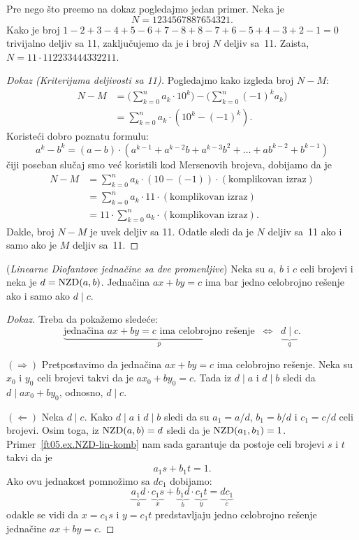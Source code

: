 Pre nego \v sto pre\dj emo na dokaz pogledajmo jedan primer. Neka je
$$
  N = 1234567887654321.
$$
Kako je broj $1 - 2 + 3 - 4 + 5 - 6 + 7 - 8 + 8 - 7 + 6 - 5 + 4 - 3 + 2 - 1 = 0$
trivijalno deljiv sa 11, zaklju\v cujemo da je i broj $N$ deljiv sa~11. Zaista, $N = 11 \cdot 112233444332211$.

\begin{proof}[Dokaz (Kriterijuma deljivosti sa 11)]
  Pogledajmo kako izgleda broj $N - M$:
  \begin{align*}
    N - M &= \Big(\sum_{k=0}^n a_k \cdot 10^k\Big) - \Big(\sum_{k=0}^n (-1)^k a_k\Big)\\
          &= \sum_{k=0}^n a_k \cdot (10^k - (-1)^k).
  \end{align*}
  Koriste\'ci dobro poznatu formulu:
  $$
    a^k - b^k = (a - b) \cdot (a^{k-1} + a^{k-2}b + a^{k-3} b^2 + \ldots + ab^{k-2} + b^{k-1})
  $$
  \v ciji poseban slu\v caj smo ve\'c koristili kod Mersenovih brojeva, dobijamo da je
  \begin{align*}
    N - M &= \sum_{k=0}^n a_k \cdot (10 - (-1)) \cdot (\text{komplikovan izraz})\\
    &= \sum_{k=0}^n a_k \cdot 11 \cdot (\text{komplikovan izraz})\\
    &= 11 \cdot \sum_{k=0}^n a_k \cdot (\text{komplikovan izraz}).
  \end{align*}
  Dakle, broj $N - M$ je uvek deljiv sa 11. Odatle sledi da je $N$ deljiv sa~11 ako i samo ako je $M$
  deljiv sa~11.
\end{proof}

\begin{EX} (\textit{Linearne Diofantove jedna\v cine sa dve promenljive})
  Neka su $a$, $b$ i $c$ celi brojevi i neka je $d = \mathrm{NZD}(a, b)$.
  Jedna\v cina $ax + by = c$ ima bar jedno celobrojno re\v senje ako i samo ako $d \mid c$.
\end{EX}
\begin{proof}[Dokaz]
  Treba da poka\v zemo slede\'ce:
  $$
    \underbrace{\text{jedna\v cina $ax + by = c$ ima celobrojno re\v senje}}_p \;\;\Leftrightarrow\;\; \underbrace{d \mid c}_q.
  $$
  
  $(\Rightarrow)$
  Pretpostavimo da jedna\v cina $ax + by = c$ ima celobrojno re\v senje. Neka su
  $x_0$ i $y_0$ celi brojevi takvi da je $ax_0 + by_0 = c$. Tada iz $d \mid a$ i $d \mid b$
  sledi da $d \mid ax_0 + by_0$, odnosno, $d \mid c$.
  
  $(\Leftarrow)$
  Neka $d \mid c$. Kako $d \mid a$ i $d \mid b$ sledi da su $a_1 = a/d$, $b_1 = b/d$ i $c_1 = c/d$ celi
  brojevi. Osim toga, iz $\mathrm{NZD}(a, b) = d$ sledi da je $\mathrm{NZD}(a_1, b_1) = 1$. Primer~\ref{ft05.ex.NZD-lin-komb}
  nam sada garantuje da postoje celi brojevi $s$ i $t$ takvi da je
  $$
    a_1 s + b_1 t = 1.
  $$
  Ako ovu jednakost pomno\v zimo sa $dc_1$ dobijamo:
  $$
    \underbrace{a_1 d}_a \cdot \underbrace{c_1 s}_x + \underbrace{b_1 d}_b \cdot \underbrace{c_1 t}_y = \underbrace{dc_1}_c
  $$
  odakle se vidi da $x = c_1 s$ i $y = c_1 t$ predstavljaju jedno celobrojno re\v senje jedna\v cine
  $ax + by = c$.
\end{proof}



